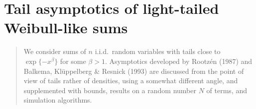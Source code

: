 \chapter{Tail asymptotics of light-tailed Weibull-like sums}

% 
% 
% 



\begin{abstract}
We consider sums of $n$ i.i.d.\ random variables with tails close to $\exp\{-x^\beta\}$ for some $\beta>1$. Asymptotics  developed
by Rootz\'en (1987) and Balkema, Kl\"uppelberg \& Resnick (1993) are discussed from the point of view of tails rather of densities, using a somewhat different angle,  and supplemented with bounds, results on a random number $N$ of terms, and simulation algorithms.
\end{abstract}


